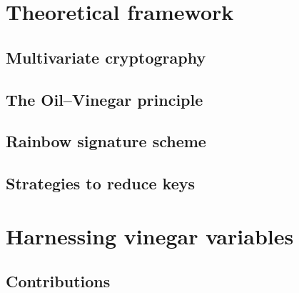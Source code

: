 \documentclass[openright]{report}
\begin{document}
\chapter{Theoretical framework}

\section{Multivariate cryptography}

\section{The Oil--Vinegar principle}

\section{Rainbow signature scheme}

\section{Strategies to reduce keys}

\chapter{Harnessing vinegar variables}

\section{Contributions}



\end{document}
